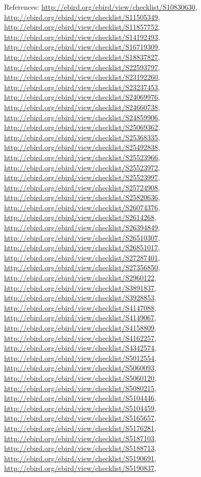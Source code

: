\documentclass[9pt, article]{memoir}
\begin{document}
\begin{multicols}{2}
References: 
\url{http://ebird.org/ebird/view/checklist/S10830630}, 
\url{http://ebird.org/ebird/view/checklist/S11505349}, 
\url{http://ebird.org/ebird/view/checklist/S11857752}, 
\url{http://ebird.org/ebird/view/checklist/S14192493}, 
\url{http://ebird.org/ebird/view/checklist/S16719309}, 
\url{http://ebird.org/ebird/view/checklist/S18837827}, 
\url{http://ebird.org/ebird/view/checklist/S22593797}, 
\url{http://ebird.org/ebird/view/checklist/S23192260}, 
\url{http://ebird.org/ebird/view/checklist/S23237453}, 
\url{http://ebird.org/ebird/view/checklist/S24069976}, 
\url{http://ebird.org/ebird/view/checklist/S24660738}, 
\url{http://ebird.org/ebird/view/checklist/S24859906}, 
\url{http://ebird.org/ebird/view/checklist/S25069362}, 
\url{http://ebird.org/ebird/view/checklist/S25368335}, 
\url{http://ebird.org/ebird/view/checklist/S25492838}, 
\url{http://ebird.org/ebird/view/checklist/S25523966}, 
\url{http://ebird.org/ebird/view/checklist/S25523972}, 
\url{http://ebird.org/ebird/view/checklist/S25523997}, 
\url{http://ebird.org/ebird/view/checklist/S25724908}, 
\url{http://ebird.org/ebird/view/checklist/S25820636}, 
\url{http://ebird.org/ebird/view/checklist/S26074376}, 
\url{http://ebird.org/ebird/view/checklist/S2614268}, 
\url{http://ebird.org/ebird/view/checklist/S26394849}, 
\url{http://ebird.org/ebird/view/checklist/S26510307}, 
\url{http://ebird.org/ebird/view/checklist/S26851017}, 
\url{http://ebird.org/ebird/view/checklist/S27287401}, 
\url{http://ebird.org/ebird/view/checklist/S27356850}, 
\url{http://ebird.org/ebird/view/checklist/S2960122}, 
\url{http://ebird.org/ebird/view/checklist/S3891837}, 
\url{http://ebird.org/ebird/view/checklist/S3928853}, 
\url{http://ebird.org/ebird/view/checklist/S4147088}, 
\url{http://ebird.org/ebird/view/checklist/S4149067}, 
\url{http://ebird.org/ebird/view/checklist/S4158809}, 
\url{http://ebird.org/ebird/view/checklist/S4162257}, 
\url{http://ebird.org/ebird/view/checklist/S4342574}, 
\url{http://ebird.org/ebird/view/checklist/S5012554}, 
\url{http://ebird.org/ebird/view/checklist/S5060093}, 
\url{http://ebird.org/ebird/view/checklist/S5060120}, 
\url{http://ebird.org/ebird/view/checklist/S5080215}, 
\url{http://ebird.org/ebird/view/checklist/S5104446}, 
\url{http://ebird.org/ebird/view/checklist/S5104459}, 
\url{http://ebird.org/ebird/view/checklist/S5165657}, 
\url{http://ebird.org/ebird/view/checklist/S5176281}, 
\url{http://ebird.org/ebird/view/checklist/S5187103}, 
\url{http://ebird.org/ebird/view/checklist/S5188713}, 
\url{http://ebird.org/ebird/view/checklist/S5190691}, 
\url{http://ebird.org/ebird/view/checklist/S5190837}, 

\end{multicols}
\end{document}
